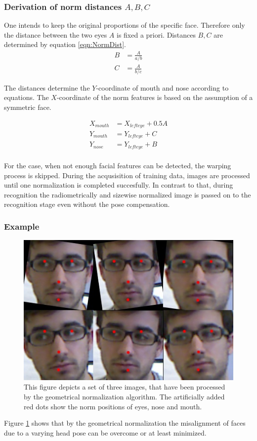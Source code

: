 \subsubsection{Derivation of norm distances $A,B,C$}
\label{ss:NormDist}
One intends to keep the original proportions of the specific face.
Therefore only the distance between the two eyes $A$ is fixed a priori. Distances $B,C$ are determined by equation
 \ref{eqn:NormDist}.
\begin{align}
\label{eqn:NormDist}
B&=\frac{A}{a/b}\\
C&=\frac{A}{b/c}
\end{align}

The distances determine the $Y$-coordinate of mouth and nose according to equations.
The $X$-coordinate of the norm features is based on the assumption of a symmetric face.

\begin{align}
X_{mouth}&=X_{lefteye}+0.5A\\
Y_{mouth}&=Y_{lefteye}+C\\
Y_{nose} &=Y_{lefteye}+B\\
\end{align}


For the case, when not enough facial features can be detected, the warping process is skipped.
During the acqusisition of training data, images are processed until one normalization is completed
succesfully. In contrast to that, during recognition the radiometrically and sizewise normalized image is passed on
to the recognition stage even without the pose compensation.


\subsubsection{Example}
\begin{figure}[h!tbp]
\includegraphics[width=1.0\textwidth]{../img/norm_geometric.jpg}
\caption{This figure depicts a set of three images, that have been processed by the geometrical normalization
algorithm. The artificially added red dots show the norm positions of eyes, nose and mouth.}
\label{fig:NormFace}
\end{figure}
Figure \ref{fig:NormFace} shows that by the geometrical normalization the misalignment of faces due to a varying head pose 
can be overcome or at least minimized.


